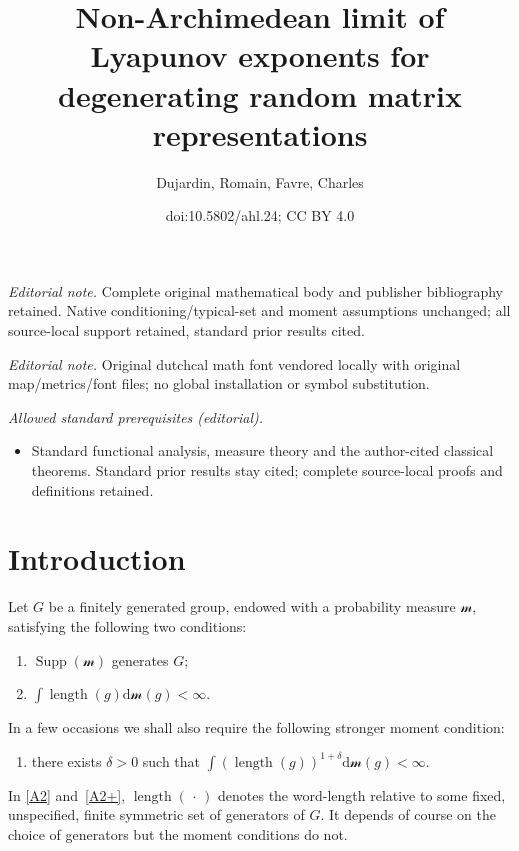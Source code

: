 \documentclass[10pt]{amsart}
\title{Non-Archimedean limit of Lyapunov exponents for degenerating random matrix representations}
\author{Dujardin, Romain, Favre, Charles}
\date{doi:10.5802/ahl.24; CC BY 4.0}
\theoremstyle{definition}\newtheorem{defi}[theo]{Definition}\newtheorem{rema}[theo]{Remark}\newtheorem{exam}[theo]{Example}\newtheorem{exem}[theo]{Example}\newtheorem{nota}[theo]{Notation}
\DeclareMathOperator{\supp}{Supp}
\DeclareMathOperator{\length}{length}
\newcommand{\sm}{\mathcal{m}}
\newcommand*{\dd}{\mathrm{d}}
\newcommand*{\dsm}{\dd \sm}
\begin{document}
\maketitle
\noindent\textit{Editorial note.} Complete original mathematical body and publisher bibliography retained. Native conditioning/typical-set and moment assumptions unchanged; all source-local support retained, standard prior results cited.\par\medskip
\noindent\textit{Editorial note.} Original dutchcal math font vendored locally with original map/metrics/font files; no global installation or symbol substitution.\par\medskip
\noindent\textit{Allowed standard prerequisites (editorial).}\begin{itemize}
\item Standard functional analysis, measure theory and the author-cited classical theorems. Standard prior results stay cited; complete source-local proofs and definitions retained.
\end{itemize}\medskip

\section*{Introduction}

Let $G$ be a finitely generated group, endowed with a probability measure $\sm$, satisfying the following two conditions:
\begin{enumerate}\renewcommand{\theenumi}{A\arabic{enumi}}
\item \label{A1} $\supp(\sm)$ generates $G$;
\item \label{A2} $ \int \length(g) \dsm(g)<\infty$.
\end{enumerate}
In a few occasions we shall also require the following stronger moment condition:
\begin{enumerate}\renewcommand{\theenumi}{A\arabic{enumi}${}^+$}\setcounter{enumi}{1}
\item \label{A2+} there exists $\delta >0$ such that $ \int (\length(g))^{1+\delta} \dsm(g)<\infty$.
\end{enumerate}
In \eqref{A2} and~\eqref{A2+}, $\length({\,\cdot\,})$ denotes the word-length relative to some fixed, unspecified, finite symmetric set of generators of $G$. It depends of course on the choice of generators but the moment conditions do not.

\end{document}
